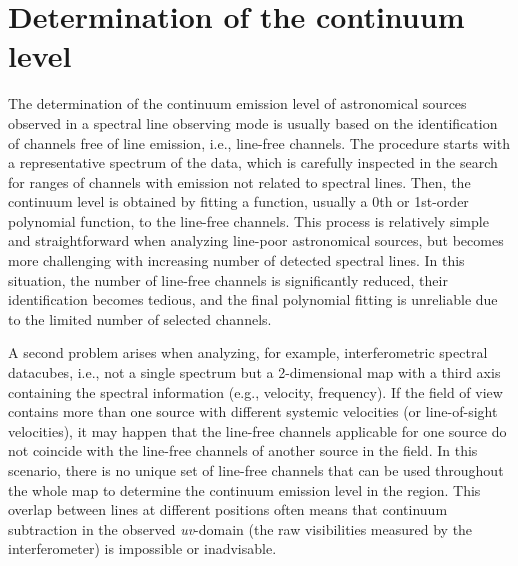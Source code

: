 \documentclass{aa}
\begin{document}
\section{Determination of the continuum level}\label{s:cont}

The determination of the continuum emission level of astronomical sources observed in a spectral line observing mode is usually based on the identification of channels free of line emission, i.e., line-free channels. The procedure starts with a representative spectrum of the data, which is carefully inspected in the search for ranges of channels with emission not related to spectral lines. Then, the continuum level is obtained by fitting a function, usually a 0th or 1st-order polynomial function, to the line-free channels. This process is relatively simple and straightforward when analyzing line-poor astronomical sources, but becomes more challenging with increasing number of detected spectral lines. In this situation, the number of line-free channels is significantly reduced, their identification becomes tedious, and the final polynomial fitting is unreliable due to the limited number of selected channels.

A second problem arises when analyzing, for example, interferometric spectral datacubes, i.e., not a single spectrum but a 2-dimensional map with a third axis containing the spectral information (e.g., velocity, frequency). If the field of view contains more than one source with different systemic velocities (or line-of-sight velocities), it may happen that the line-free channels applicable for one source do not coincide with the line-free channels of another source in the field. In this scenario, there is no unique set of line-free channels that can be used throughout the whole map to determine the continuum emission level in the region. This overlap between lines at different positions often means that continuum subtraction in the observed \textit{uv}-domain (the raw visibilities measured by the interferometer) is impossible or inadvisable.
\end{document}
